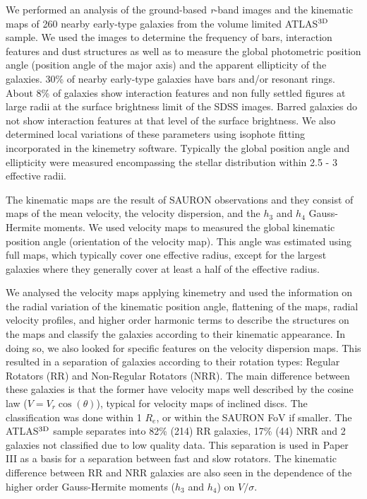 \documentclass[usenatbib,usegraphicx]{mn2e}
\begin{document}
We performed an analysis of the ground-based {\it r}-band images and the kinematic maps of 260 nearby early-type galaxies from the volume limited ATLAS$^{\rm 3D}$ sample. We used the images to determine the frequency of bars, interaction features and dust structures as well as to measure the global photometric position angle (position angle of the major axis) and the apparent ellipticity of the galaxies. 30\% of nearby early-type galaxies have bars and/or resonant rings. About 8\% of galaxies show interaction features and non fully settled figures at large radii at the surface brightness limit of the SDSS images. Barred galaxies do not show interaction features at that level of the surface brightness. We also determined local variations of these parameters using isophote fitting incorporated in the kinemetry software. Typically the global position angle and ellipticity were measured encompassing the stellar distribution within 2.5 - 3 effective radii.  

The kinematic maps are the result of SAURON observations and they consist of maps of the mean velocity, the velocity dispersion, and the $h_3$ and $h_4$ Gauss-Hermite moments. We used velocity maps to measured the global kinematic position angle (orientation of the velocity map). This angle was estimated using full maps, which typically cover one effective radius, except for the largest galaxies where they generally cover at least a half of the effective radius. 

We analysed the velocity maps applying kinemetry and used the information on the radial variation of the kinematic position angle, flattening of the maps, radial velocity profiles, and higher order harmonic terms to describe the structures on the maps and classify the galaxies according to their kinematic appearance. In doing so, we also looked for specific features on the velocity dispersion maps. This resulted in a separation of galaxies according to their rotation types:  Regular Rotators (RR) and Non-Regular Rotators (NRR). The main difference between these galaxies is that the former have velocity maps well described by the cosine law ($V=V_r \cos(\theta)$), typical for velocity maps of inclined discs. The classification was done within 1 $R_e$, or within the SAURON FoV if smaller. The ATLAS$^{\rm 3D}$ sample separates into 82\% (214) RR galaxies, 17\% (44) NRR and 2 galaxies not classified due to low quality data. This separation is used in Paper III as a basis for a separation between fast and slow rotators. The kinematic difference between RR  and NRR galaxies are also seen in the dependence of the higher order Gauss-Hermite moments ($h_3$ and $h_4$) on $V/\sigma$.
\end{document}
